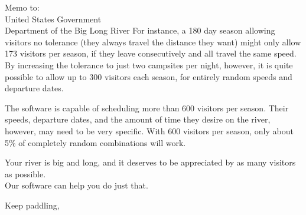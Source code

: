 \documentclass[11pt]{letter} %
\begin{document}
\begin{letter}{Memo to:\\
United States Government\\
Department of the Big Long River}
\noindent
For instance, a 180 day season allowing visitors no
tolerance (they always travel the distance they want) might only allow 173
visitors per season, if they leave consecutively and all travel
the same speed. By increasing the tolerance to just two campsites per night,
however, it is quite possible to allow up to 300 visitors each season, for
entirely random speeds and departure dates.

\noindent
The software is capable of scheduling more than 600 visitors per season.
Their speeds, departure dates, and the amount of time they desire on the
river, however, may need to be very specific. With 600 visitors per season,
only about 5\% of completely random combinations will work.

\noindent
Your river is big and long, and it deserves to be appreciated by as many
visitors as possible.\\ Our software can help you do just that.


\noindent

\closing{Keep paddling,}



 \vfill
\end{letter}
\end{document}

